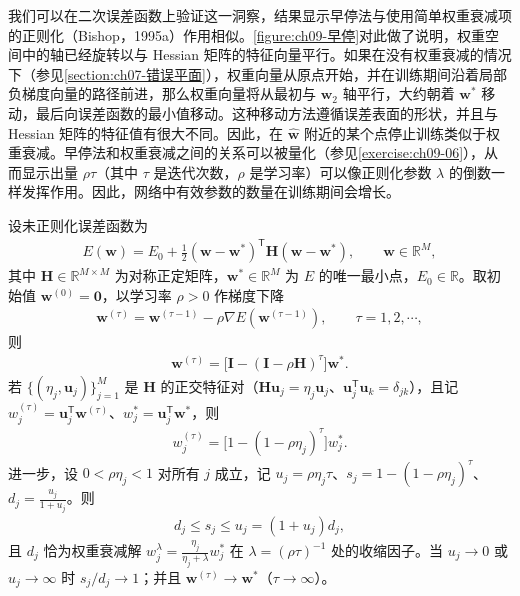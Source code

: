 \documentclass[../../main.tex]{subfiles}
\begin{document}
我们可以在二次误差函数上验证这一洞察，结果显示早停法与使用简单权重衰减项的正则化（Bishop，1995a）作用相似。\cref{figure:ch09-早停}对此做了说明，权重空间中的轴已经旋转以与 Hessian 矩阵的特征向量平行。如果在没有权重衰减的情况下（参见\cref{section:ch07-错误平面}），权重向量从原点开始，并在训练期间沿着局部负梯度向量的路径前进，那么权重向量将从最初与 $\boldsymbol{w}_{2}$ 轴平行，大约朝着 $\boldsymbol{w}^{*}$ 移动，最后向误差函数的最小值移动。这种移动方法遵循误差表面的形状，并且与 Hessian 矩阵的特征值有很大不同。因此，在 $\hat{\boldsymbol{w}}$ 附近的某个点停止训练类似于权重衰减。早停法和权重衰减之间的关系可以被量化（参见\cref{exercise:ch09-06}），从而显示出量 $\rho\tau$（其中 $\tau$ 是迭代次数，$\rho$ 是学习率）可以像正则化参数 $\lambda$ 的倒数一样发挥作用。因此，网络中有效参数的数量在训练期间会增长。

\begin{theorem}[早停与权重衰减的等价性]\label{theorem:ch09-早停等价}
设未正则化误差函数为
\begin{align*}
E(\boldsymbol{w})=E_{0}+\frac{1}{2}(\boldsymbol{w}-\boldsymbol{w}^{*})^{\mathsf T}\boldsymbol{H}(\boldsymbol{w}-\boldsymbol{w}^{*}),\qquad \boldsymbol{w}\in\mathbb{R}^{M},
\end{align*}
其中 $\boldsymbol{H}\in\mathbb{R}^{M\times M}$ 为对称正定矩阵，$\boldsymbol{w}^{*}\in\mathbb{R}^{M}$ 为 $E$ 的唯一最小点，$E_{0}\in\mathbb{R}$。取初始值 $\boldsymbol{w}^{(0)}=\boldsymbol{0}$，以学习率 $\rho>0$ 作梯度下降
\begin{align*}
\boldsymbol{w}^{(\tau)}=\boldsymbol{w}^{(\tau-1)}-\rho\nabla E(\boldsymbol{w}^{(\tau-1)}),\qquad \tau=1,2,\cdots,
\end{align*}
则
\begin{align*}
\boldsymbol{w}^{(\tau)}=\bigl[\boldsymbol{I}-(\boldsymbol{I}-\rho\boldsymbol{H})^{\tau}\bigr]\boldsymbol{w}^{*}.
\end{align*}
若 $\{(\eta_{j},\boldsymbol{u}_{j})\}_{j=1}^{M}$ 是 $\boldsymbol{H}$ 的正交特征对（$\boldsymbol{H}\boldsymbol{u}_{j}=\eta_{j}\boldsymbol{u}_{j}$、$\boldsymbol{u}_{j}^{\mathsf T}\boldsymbol{u}_{k}=\delta_{jk}$），且记 $w_{j}^{(\tau)}=\boldsymbol{u}_{j}^{\mathsf T}\boldsymbol{w}^{(\tau)}$、$w_{j}^{*}=\boldsymbol{u}_{j}^{\mathsf T}\boldsymbol{w}^{*}$，则
\begin{align*}
w_{j}^{(\tau)}=\bigl[1-(1-\rho\eta_{j})^{\tau}\bigr]w_{j}^{*}.
\end{align*}
进一步，设 $0<\rho\eta_{j}<1$ 对所有 $j$ 成立，记 $u_{j}=\rho\eta_{j}\tau$、$s_{j}=1-(1-\rho\eta_{j})^{\tau}$、$d_{j}=\frac{u_{j}}{1+u_{j}}$。则
\begin{align*}
d_{j}\leqslant s_{j}\leqslant u_{j}=(1+u_{j})d_{j},
\end{align*}
且 $d_{j}$ 恰为权重衰减解 $w_{j}^{\lambda}=\frac{\eta_{j}}{\eta_{j}+\lambda}w_{j}^{*}$ 在 $\lambda=(\rho\tau)^{-1}$ 处的收缩因子。当 $u_{j}\to0$ 或 $u_{j}\to\infty$ 时 $s_{j}/d_{j}\to1$；并且 $\boldsymbol{w}^{(\tau)}\to\boldsymbol{w}^{*}$（$\tau\to\infty$）。
\end{theorem}
\end{document}

